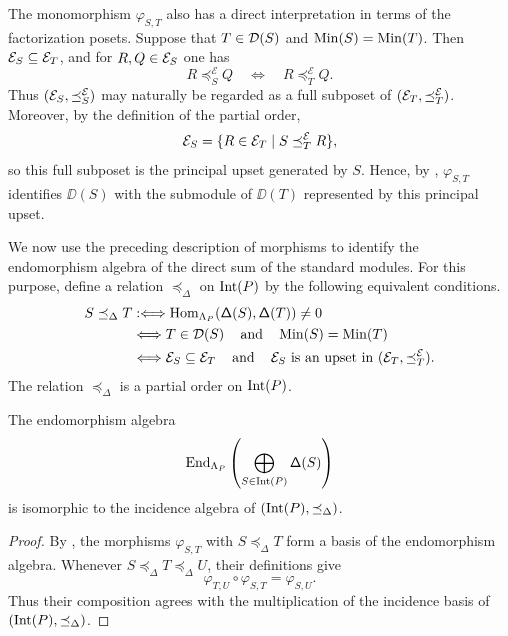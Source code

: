 The monomorphism $\varphi_{S,T}$ also has a direct interpretation in
terms of the factorization posets.  Suppose that
$T\in\mathcal D(S)$ and $\operatorname{Min}(S)=\operatorname{Min}(T)$. Then 
$\mathcal E_S\subseteq\mathcal E_T$, and for $R,Q\in\mathcal E_S$ one has
\[
R\preceq_S^{\mathcal E}Q
\quad\Longleftrightarrow\quad
R\preceq_T^{\mathcal E}Q.
\]
Thus $(\mathcal E_S,\preceq_S^{\mathcal E})$ may naturally be regarded as a
full subposet of $(\mathcal E_T,\preceq_T^{\mathcal E})$.  Moreover, by the
definition of the partial order,
\[
\mathcal E_S
=
\{R\in\mathcal E_T\mid S\preceq_T^{\mathcal E}R\},
\]
so this full subposet is the principal upset generated by $S$.  Hence,
by ,
$\varphi_{S,T}$ identifies $\DD(S)$ with the submodule of $\DD(T)$
represented by this principal upset.

We now use the preceding description of morphisms to identify the
endomorphism algebra of the direct sum of the standard modules. For
this purpose, define a relation $\preceq_{\Delta}$ on $\operatorname{Int}(P)$ by the
following equivalent conditions.
\begin{equation}
\begin{aligned}
S\preceq_{\Delta}T
&:\Longleftrightarrow
\operatorname{Hom}_{\Lambda_P}(\mathsf\Delta(S),\mathsf\Delta(T))\neq0\\
&\Longleftrightarrow
T\in\mathcal D(S) \operatorname{\quad \text{and} \quad}\nolimits \operatorname{Min}(S)=\operatorname{Min}(T)\\
&\Longleftrightarrow
\mathcal E_S\subseteq\mathcal E_T
\operatorname{\quad \text{and} \quad}\nolimits
\mathcal E_S\text{ is an upset in }
(\mathcal E_T,\preceq_T^{\mathcal E}).
\end{aligned}
\label{eq:standard-morphism-order-support}
\end{equation}
The relation $\preceq_{\Delta}$ is a partial order on $\operatorname{Int}(P)$.

\begin{corollary}
\label{cor:standard-endomorphism-incidence}
The endomorphism algebra
\[
\operatorname{End}_{\Lambda_P}
\left(
\bigoplus_{S\in\operatorname{Int}(P)}\mathsf\Delta(S)
\right)
\]
is isomorphic to the incidence algebra of
$(\operatorname{Int}(P),\preceq_{\Delta})$.
\end{corollary}

\begin{proof}
By , the morphisms
$\varphi_{S,T}$ with $S\preceq_{\Delta}T$ form a basis of the
endomorphism algebra. Whenever
$S\preceq_{\Delta}T\preceq_{\Delta}U$, their definitions give
\[
\varphi_{T,U}\circ\varphi_{S,T}
=
\varphi_{S,U}.
\]
Thus their composition agrees with the multiplication of the incidence
basis of $(\operatorname{Int}(P),\preceq_{\Delta})$.
\end{proof}

